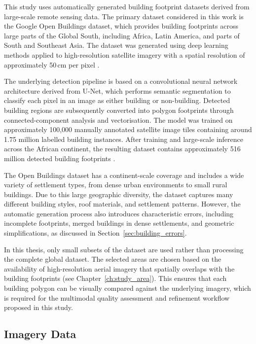 This study uses automatically generated building footprint datasets derived from large-scale remote sensing data. The primary dataset considered in this work is the Google Open Buildings dataset, which provides building footprints across large parts of the Global South, including Africa, Latin America, and parts of South and Southeast Asia. The dataset was generated using deep learning methods applied to high-resolution satellite imagery with a spatial resolution of approximately 50\,cm per pixel \citep{sirko2021continentalscalebuildingdetectionhigh, googleopenbuildings}.

The underlying detection pipeline is based on a convolutional neural network architecture derived from U-Net, which performs semantic segmentation to classify each pixel in an image as either building or non-building. Detected building regions are subsequently converted into polygon footprints through connected-component analysis and vectorisation. The model was trained on approximately 100,000 manually annotated satellite image tiles containing around 1.75 million labelled building instances. After training and large-scale inference across the African continent, the resulting dataset contains approximately 516 million detected building footprints \citep{sirko2021continentalscalebuildingdetectionhigh}.

The Open Buildings dataset has a continent-scale coverage and includes a wide variety of settlement types, from dense urban environments to small rural buildings. Due to this large geographic diversity, the dataset captures many different building styles, roof materials, and settlement patterns. However, the automatic generation process also introduces characteristic errors, including incomplete footprints, merged buildings in dense settlements, and geometric simplifications, as discussed in Section~\ref{sec:building_errors}.

In this thesis, only small subsets of the dataset are used rather than processing the complete global dataset. The selected areas are chosen based on the availability of high-resolution aerial imagery that spatially overlaps with the building footprints (see Chapter~\ref{ch:study_area}). This ensures that each building polygon can be visually compared against the underlying imagery, which is required for the multimodal quality assessment and refinement workflow proposed in this study.


\subsection{Imagery Data}

